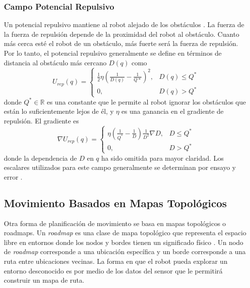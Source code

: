 \subsubsection{Campo Potencial Repulsivo}
Un potencial repulsivo mantiene al robot alejado de los obstáculos 
\cite{koren1991potential}. La fuerza de la fuerza de repulsión depende de la 
proximidad del robot al obstáculo. Cuanto más cerca esté el robot de un 
obstáculo, más fuerte será la fuerza de repulsión. Por lo tanto, el 
potencial repulsivo generalmente se define en términos de distancia al 
obstáculo más cercano $D(q)$ como 
\begin{equation}
U_{rep}(q) =
\begin{cases}
	\frac{1}{2}\eta(\frac{1}{D(q)} - \frac{1}{Q*})^2, & D(q)\leq Q^* \\
	0, & D(q) > Q^*
\end{cases}
\label{eq:pot_rep}
\end{equation}
donde $Q^* \in \mathbb R$ es una constante que le permite al robot ignorar 
los obst\'aculos que est\'an lo suficientemente lejos de \'el, y $\eta$ es 
una ganancia en el gradiente de repulsi\'on. El gradiente es 
\begin{equation}
\nabla U_{rep}(q) =
\begin{cases}
	\eta(\frac{1}{Q^*} - \frac{1}{D})\frac{1}{D^2} \nabla D, & D \leq Q^* \\
	0, & D > Q^*
\end{cases}
\label{eqn:gradient_rep}
\end{equation}
donde la dependencia de $D$ en $q$ ha sido omitida para mayor claridad. Los 
escalares utilizados para este campo generalmente se determinan por ensayo 
y error \cite{choset2005principles}.

\subsection{Movimiento Basados en Mapas Topológicos} %
Otra forma de planificación de movimiento se basa en mapas topológicos o 
roadmaps. Un \textit{roadmap} es una clase de mapa topológico que representa el 
espacio libre en entornos donde los nodos y bordes tienen un significado 
físico \cite{choset2005RoadMap}. Un nodo de \textit{roadmap} corresponde a una 
ubicación específica y un borde corresponde a una ruta entre ubicaciones 
vecinas. La forma en que el robot pueda explorar un entorno desconocido es 
por medio de los datos del sensor que le permitirá construir un mapa de ruta.

